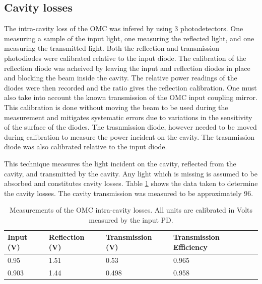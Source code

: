 \subsection{Cavity losses}
The intra-cavity loss of the OMC was infered by using 3 photodetectors. %
One measuring a sample of the input light, one measuring the reflected light, and one measuring the transmitted light. %
Both the reflection and transmission photodiodes were calibrated relative to the input diode. %
 The calibration of the reflection diode was acheived by leaving the input and reflection diodes in place and blocking the beam inside the cavity. %
The relative power readings of the diodes were then recorded and the ratio gives the reflection calibration. %
One must also take into account the known transmission of the OMC input coupling mirror. %
This calibration is done without moving the beam to be used during the measurement and mitigates systematic errors due to variations in the sensitivity of the surface of the diodes. %
The trasnmission diode, however needed to be moved during calibration to measure the power incident on the cavity. %
The trasnmission diode was also calibrated relative to the input diode.

This technique measures the light incident on the cavity, reflected from the cavity, and transmitted by the cavity. %
Any light which is missing is assumed to be absorbed and constitutes cavity losses. %
Table \ref{tab:lossmeas} shows the data taken to determine the cavity losses. %
 The cavity transmission was measured to be approximately 96\perc{}.

\begin{table}
  \begin{center}
    \begin{tabular}{lll|l}
      \hline
      Input (V) & Reflection (V) & Transmission (V) & Transmission Efficiency \\
      \hline
      0.95 & 1.51 & 0.53 & 0.965 \\
      0.903 & 1.44 &0.498 & 0.958\\
      \hline
    \end{tabular}
  \caption[Measurements of the OMC intra-cavity losses.]{Measurements of the OMC intra-cavity losses. All units are calibrated in Volts measured by the input PD.}
  \label{tab:lossmeas}
  \end{center}
\end{table}



